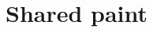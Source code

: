 \documentclass[11pt,a4paper,titlepage]{article}
\begin{document}
\section*{Shared paint}

\end{document}
